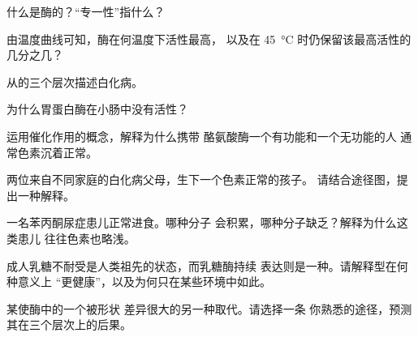 \begin{exercise}[$\star$]\label{exo:g11:enzymes-and-phenotype:2}
什么是酶的？“专一性”指什么？
\end{exercise}

\begin{exercise}[$\star$]\label{exo:g11:enzymes-and-phenotype:3}
由温度曲线可知，酶在何温度下活性最高，
以及在
\qty{45}{\celsius} 时仍保留该最高活性的几分之几？
\end{exercise}

\begin{exercise}[$\star$]\label{exo:g11:enzymes-and-phenotype:4}
从的三个层次描述白化病。
\end{exercise}

\begin{exercise}[$\star$]\label{exo:g11:enzymes-and-phenotype:5}
为什么胃蛋白酶在小肠中没有活性？
\end{exercise}

\begin{exercise}[$\star\star$]\label{exo:g11:enzymes-and-phenotype:6}
运用催化作用的概念，解释为什么携带
酪氨酸酶一个有功能和一个无功能的人
通常色素沉着正常。
\end{exercise}

\begin{exercise}[$\star\star$]\label{exo:g11:enzymes-and-phenotype:7}
两位来自不同家庭的白化病父母，生下一个色素正常的孩子。
请结合途径图，提出一种解释。
\end{exercise}

\begin{exercise}[$\star\star$]\label{exo:g11:enzymes-and-phenotype:8}
一名苯丙酮尿症患儿正常进食。哪种分子
会积累，哪种分子缺乏？解释为什么这类患儿
往往色素也略浅。
\end{exercise}

\begin{exercise}[$\star\star$]\label{exo:g11:enzymes-and-phenotype:9}
成人乳糖不耐受是人类祖先的状态，而乳糖酶持续
表达则是一种。请解释型在何种意义上
“更健康”，以及为何只在某些环境中如此。
\end{exercise}

\begin{exercise}[$\star\star$]\label{exo:g11:enzymes-and-phenotype:10}
某使酶中的一个被形状
差异很大的另一种取代。请选择一条
你熟悉的途径，预测其在三个层次上的后果。
\end{exercise}

